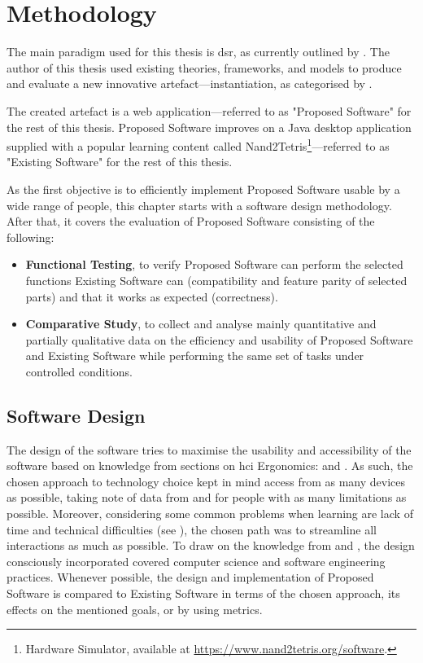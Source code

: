 \chapter{Methodology}
\label{Methodology}

The main paradigm used for this thesis is \gls{dsr}, as currently outlined by \textcite{brocke2020designscience}.
The author of this thesis used existing theories, frameworks, and models to produce and evaluate a new innovative artefact---instantiation, as categorised by \textcite{hevner2004designscience}.

The created artefact is a web application---referred to as "Proposed Software" for the rest of this thesis.
Proposed Software improves on a Java desktop application supplied with a popular learning content called Nand2Tetris\footnote{Hardware Simulator, available at \url{https://www.nand2tetris.org/software}.}---referred to as "Existing Software" for the rest of this thesis.

As the first objective is to efficiently implement Proposed Software usable by a wide range of people, this chapter starts with a software design methodology.
After that, it covers the evaluation of Proposed Software consisting of the following:

\begin{itemize}
    \item \textbf{Functional Testing}, to verify Proposed Software can perform the selected functions Existing Software can (compatibility and feature parity of selected parts) and that it works as expected (correctness).
    \item \textbf{Comparative Study}, to collect and analyse mainly quantitative and partially qualitative data on the efficiency and usability of Proposed Software and Existing Software while performing the same set of tasks under controlled conditions.
\end{itemize}

\section{Software Design}
\label{sec:software-design}

The design of the software tries to maximise the usability and accessibility of the software based on knowledge from sections on \gls{hci} Ergonomics:  and .
As such, the chosen approach to technology choice kept in mind access from as many devices as possible, taking note of data from  and for people with as many limitations as possible.
Moreover, considering some common problems when learning are lack of time and technical difficulties (see ), the chosen path was to streamline all interactions as much as possible.
To draw on the knowledge from  and , the design consciously incorporated covered computer science and software engineering practices.
Whenever possible, the design and implementation of Proposed Software is compared to Existing Software in terms of the chosen approach, its effects on the mentioned goals, or by using metrics.

